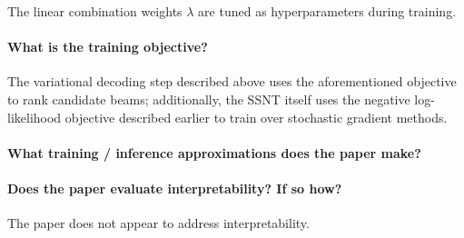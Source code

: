 \documentclass[11pt]{article}
\begin{document}
The linear combination weights $\lambda$ are tuned as hyperparameters during training.

\paragraph{What is the training objective?} The variational decoding step described above uses the aforementioned objective to rank candidate beams; additionally, the SSNT itself uses the negative log-likelihood objective described earlier to train over stochastic gradient methods.

\paragraph{What training / inference approximations does the paper make?} 

\paragraph{Does the paper evaluate interpretability? If so how?} The paper does not appear to address interpretability.



\end{document}

